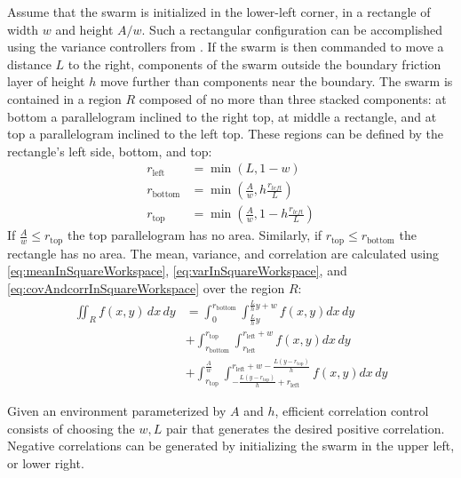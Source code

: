  Assume that the swarm is initialized in the lower-left corner, in a rectangle of width $w$ and height $A/w$. 
 Such a rectangular configuration can be accomplished using the variance controllers from \citep{ShahrokhiIROS2015}. 
  If the swarm is then commanded to move a distance $L$ to the right, components of the swarm outside the boundary friction layer of height $h$ move further than components near the boundary. 
   The swarm is contained in a region $R$ composed of no more than three stacked components: at bottom a parallelogram inclined to the right top, at middle a rectangle, and at top a parallelogram inclined to the left top. These regions can be defined by the rectangle's left side, bottom, and top:
\begin{align}
r_{\text{left}} &= \min (L,1-w)\nonumber \\
r_{\text{bottom}} &=\min \left(\frac{A}{w}, h\frac{r_{left}}{L}  \right)\nonumber \\
r_{\text{top}}  &= \min \left(\frac{A}{w}, 1-h\frac{r_{left}}{L}  \right)
\end{align}
If $\frac{A}{w} \le r_{\text{top}}$ the top parallelogram has no area. 
 Similarly, if $r_{\text{top}} \le r_{\text{bottom}}$ the rectangle has no area. 
The mean, variance, and correlation are calculated  using \eqref{eq:meanInSquareWorkspace}, \eqref{eq:varInSquareWorkspace}, and \eqref{eq:covAndcorrInSquareWorkspace} over the region $R$:
\begin{align} \iint_R f(x,y) \, dx \,dy &=  \int_0^{r_{\text{bottom}}}  \int_{\frac{L}{h}y}^{\frac{L}{h}y+w}  f(x,y)  dx \, dy \label{eq:correlationFriction} \\
&+\int_{r_{\text{bottom}}}^{r_{\text{top}}} \int_{r_{\text{left}}}^{r_{\text{left}} +w} f(x,y)    dx \, dy \nonumber\\
&+\int_{r_{\text{top}}}^{\frac{A}{w}} \int_{-\frac{L (y-r_{\text{top}})}{h}+r_{\text{left}}}^{r_{\text{left}}+w-\frac{L (y-r_{\text{top}})}{h}} f(x,y)   dx \, dy \nonumber
\end{align}
 
 Given an environment parameterized by $A$ and $h$, efficient correlation control consists of choosing the $w,L$ pair  that generates the desired positive correlation.
  Negative correlations can be generated by initializing the swarm in the upper left, or lower right.



